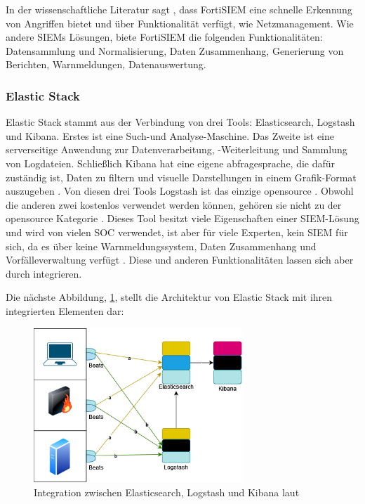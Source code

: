 In der wissenschaftliche Literatur sagt \cite{Ramires_fortsiem}, dass FortiSIEM eine schnelle Erkennung von Angriffen bietet und über  Funktionalität verfügt, wie Netzmanagement. Wie andere \glspl{SIEM} Lösungen, biete FortiSIEM die folgenden Funktionalitäten: Datensammlung und Normalisierung, Daten Zusammenhang, Generierung von Berichten, Warnmeldungen, Datenauswertung.


\subsubsection{Elastic Stack}
Elastic Stack stammt aus der Verbindung von drei Tools: Elasticsearch, Logstash und Kibana. Erstes ist eine Such-und Analyse-Maschine. Das Zweite ist eine serverseitige Anwendung zur Datenverarbeitung, -Weiterleitung und Sammlung von Logdateien. Schließlich Kibana \label{kibana} hat eine eigene \gls{abfragesprache}, die dafür zuständig ist, Daten zu filtern und visuelle Darstellungen in einem Grafik-Format auszugeben \citep{packt_elkstack}. Von diesen drei Tools Logstash ist das einzige \gls{opensource} \citep{elastic_OSI}. Obwohl die anderen zwei kostenlos verwendet werden können, gehören sie nicht zu der \gls{opensource} Kategorie \citep{OpenSource_Def}. Dieses Tool besitzt viele Eigenschaften einer \gls{SIEM}-Lösung und wird von vielen SOC verwendet, ist aber für viele Experten, kein \gls{SIEM} für sich, da es über keine Warnmeldungssystem, Daten Zusammenhang und Vorfälleverwaltung verfügt \citep{Miller_ELK}. Diese und anderen Funktionalitäten lassen sich aber durch  integrieren.

\newpage
Die nächste Abbildung, \ref{fig:Intregation_ELK}, stellt die Architektur von Elastic Stack mit ihren integrierten Elementen dar:

\begin{figure}[H]
   \centering
   \includegraphics[width=0.7\textwidth]{assets/ElasticStack.drawio.png}
   \caption[Integration zwischen Elasticsearch, Logstash und Kibana]
   {Integration zwischen Elasticsearch, Logstash und Kibana laut \cite{packt_elkstack} }
   \label{fig:Intregation_ELK}
   \centering
\end{figure}



